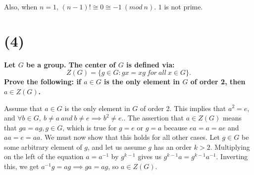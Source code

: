 \documentclass[12pt,letterpaper]{article}
\begin{document}
Also, when \(n = 1\), \((n-1)! \cong 0 \cong -1\ (mod\ n)\). \(1\) is not prime.

\section*{(4)}
{\large \textbf{Let \(G\) be a group. The center of \(G\) is defined via: \[Z(G) = \{g\in G: gx = xg\ for\ all\ x\in G\}.\] Prove the following: if \(a \in G\) is the only element in \(G\) of order 2, then \(a\in Z(G)\).}}

Assume that \(a \in G\) is the only element in \(G\) of order 2. This implies that \(a^{2} = e\), and \(\forall b \in G,\ b \neq a\ and\ b \neq e \implies b^{2} \neq e.\). The assertion that \(a \in Z(G)\) means that \(ga = ag, g \in G\), which is true for \(g = e\) or \(g = a\) because \(ea = a = ae\) and \(aa = e = aa\). We must now show that this holds for all other cases. Let \(g \in G\) be some arbitrary element of \(g\), and let us assume \(g\) has an order \(k > 2\). Multiplying on the left of the equation \(a = a^{-1}\) by \(g^{k-1}\) gives us \(g^{k-1}a = g^{k-1}a^{-1} \). Inverting this, we get \(a^{-1}g = ag \implies ga = ag\), so \(a \in Z(G)\).
\end{document}
